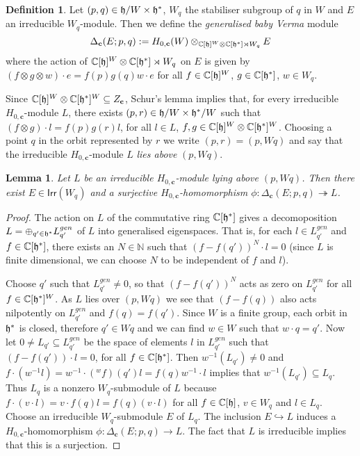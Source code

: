 \documentclass[a4apper,10pt]{amsart}
\newtheorem{lem}[thm]{Lemma}
\theoremstyle{definition}
\newtheorem{defn}[thm]{Definition}
\numberwithin{thm}{section}
\newcommand{\N}{\mathbb{N}}
\newcommand{\C}{\mathbb{C}}
\newcommand{\Verma}{\Delta_{\mathbf{c}}(E;p,q)}
\newcommand{\Irr}{\mathsf{Irr}}
\begin{document}
\begin{defn}
Let $(p,q) \in \frak{h}/W \times \frak{h}^*$, $W_q$ the
stabiliser subgroup of $q$ in $W$ and $E$ an irreducible $W_q$-module. Then we define the \textit{generalised baby Verma} module 
\begin{displaymath}
\Verma := H_{0,\mathbf{c}}(W) \otimes_{\C[\frak{h}]^W \otimes
  \C[\frak{h}^*] \rtimes W_q} E
\end{displaymath}
where the action of $\C[\frak{h}]^W \otimes \C[\frak{h}^*] \rtimes W_q$ on $E$ is given by $(f \otimes g \otimes w) \cdot e = f(p)g(q)w \cdot e$ for all $f \in \C[\frak{h}]^W$, $g \in \C[\frak{h}^*]$, $w \in W_q$.
\end{defn}

\noindent Since $\C[\frak{h}]^W \otimes \C[\frak{h}^*]^W \subseteq
Z_{\mathbf{c}}$, Schur's lemma implies that, for every irreducible
$H_{0,\mathbf{c}}$-module $L$, there exists $(p,r ) \in \frak{h}/W \times \frak{h}^*/W$ such that $(f \otimes g) \cdot l = f(p)g(r)l$, for all $l \in
L$, $f,g \in \C[\frak{h}]^W \otimes \C[\frak{h}^*]^W$. Choosing a
point $q$ in the orbit represented by $r$ we write $(p,r) = (p,Wq)$ and say that the irreducible $H_{0,\mathbf{c}}$-module $L$ \textit{lies above} $(p,Wq)$.

\begin{lem}\label{lem:Verma}
Let $L$ be an irreducible $H_{0,\mathbf{c}}$-module lying above $(p,Wq)$. Then there exist $E \in \Irr(W_q)$ and a
surjective $H_{0,\mathbf{c}}$-homomorphism $\phi : \Verma \twoheadrightarrow L$.
\end{lem}

\begin{proof}
The action on $L$ of the commutative ring $\C[\frak{h}^*]$ gives a
decomoposition $L = \oplus_{q' \in \frak{h}^*} L_{q'}^{gen}$ of $L$
into generalised eigenspaces. That is, for each $l \in L_{q'}^{gen}$
and $f \in \C[\frak{h}^*]$, there exists an $N \in \N$ such that $(f -
f(q'))^N \cdot l = 0$ (since $L$ is finite dimensional, we can choose $N$ to be independent of $f$ and $l$).

Choose $q'$ such that $L_{q'}^{gen} \neq 0$, so that $(f - f(q'))^N$ acts as zero on $L_{q'}^{gen}$ for all $f \in \C[\frak{h}^*]^W$. As $L$ lies over $(p,Wq)$ we see that $(f - f(q))$ also acts nilpotently on $L_{q'}^{gen}$ and $f(q) = f(q')$. Since $W$ is a finite group, each orbit in $\frak{h}^*$ is closed, therefore $q' \in Wq$ and we can find $w \in W$ such that $w \cdot q = q'$. Now let $0 \neq L_{q'} \subseteq  L_{q'}^{gen}$ be the space of elements $l$ in $L_{q'}^{gen}$ such that $(f - f(q')) \cdot l = 0$, for all $f \in \C[\frak{h}^*]$. Then $w^{-1}(L_{q'}) \neq 0$ and  $f \cdot (w^{-1}l) =  w^{-1} \cdot ({}^{w}f)(q')l  = f(q)w^{-1} \cdot l$ implies that $w^{-1}(L_{q'}) \subseteq L_q$. Thus $L_q$ is a nonzero $W_q$-submodule of $L$ because $f \cdot (v \cdot l) = v \cdot f(q)l = f(q)(v \cdot l)$ for all $f \in \C[\frak{h}]$, $v \in W_q$ and $l \in L_q$. Choose an irreducible $W_q$-submodule $E$ of $L_q$. The inclusion $E \hookrightarrow L$ induces a $H_{0,\mathbf{c}}$-homomorphism $\phi : \Verma \rightarrow L$. The fact that $L$ is irreducible implies that this is a
surjection.
\end{proof}  
 
\end{document}
